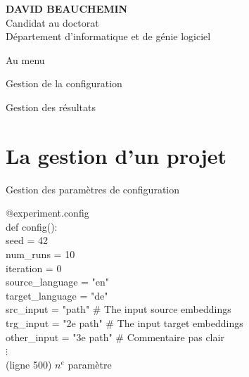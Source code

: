 \documentclass[aspectratio=169,10pt,xcolor=x11names,english,french]{beamer}
\makeatletter
\newenvironment{Scode}{%
	\def\FrameCommand##1{\hskip\@totalleftmargin
		\vrule width 3pt\colorbox{codebg}{\hspace{5pt}##1}%
		\hskip-\linewidth \hskip-\@totalleftmargin \hskip\columnwidth}%
	\MakeFramed {\advance\hsize-\width
		\@totalleftmargin\z@ \linewidth\hsize
		\advance\labelsep\fboxsep
		\@setminipage}%
}{\par\unskip\@minipagefalse\endMakeFramed}
\makeatother
\begin{document}
\begin{frame}
		\begin{minipage}{0.25\linewidth}
			\small
			\textbf{DAVID BEAUCHEMIN} \\
			Candidat au doctorat \\
			Département d'informatique et de génie logiciel
		\end{minipage}
	\end{frame}

	\begin{frame}{Au menu}
		\begin{minipage}{0.49\linewidth}
				\centering
				\fontsize{35}{35}\faCog\vfil
				\vspace{1em}
				\normalsize Gestion de la configuration
				
		\end{minipage}
		\begin{minipage}{0.49\linewidth}
				\centering
				\fontsize{35}{35}\faAreaChart\vfil
				\vspace{1em}
				\normalsize Gestion des résultats
		\end{minipage}
	\end{frame}
	
	\section{La gestion d'un projet}
	\begin{frame}{Gestion des paramètres de configuration}
		\begin{Scode}
			@experiment.config \\
			def config(): \\
			\quad	seed = 42 \\
			\quad	num\_runs = 10 \\
			\quad	iteration = 0 \\
			\quad	source\_language = "en" \\
			\quad	target\_language = "de" \\
			\quad 	src\_input = "path"  \# The input source embeddings \\
			\quad 	trg\_input = "2e path" \# The input target embeddings \\
			\quad 	other\_input = "3e path" \# Commentaire pas clair \\
			\quad   $\vdots$ \\
			\quad   (ligne 500) $n^e$ paramètre \\
		\end{Scode}
	\end{frame}
\end{document}
